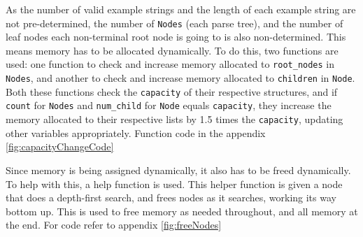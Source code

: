As the number of valid example strings and the length of each example string are not pre-determined, the number of \texttt{Nodes} (each parse tree), and the number of leaf nodes each non-terminal root node is going to is also non-determined. This means memory has to be allocated dynamically. To do this, two functions are used: one function to check and increase memory allocated to \texttt{root\_nodes} in \texttt{Nodes}, and another to check and increase memory allocated to \texttt{children} in \texttt{Node}. Both these functions check the \texttt{capacity} of their respective structures, and if \texttt{count} for \texttt{Nodes} and \texttt{num\_child} for \texttt{Node} equals \texttt{capacity}, they increase the memory allocated to their respective lists by 1.5 times the \texttt{capacity}, updating other variables appropriately. Function code in the appendix \ref{fig:capacityChangeCode}

\vspace{\baselineskip}
Since memory is being assigned dynamically, it also has to be freed dynamically. To help with this, a help function is used. This helper function is given a node that does a depth-first search, and frees nodes as it searches, working its way bottom up. This is used to free memory as needed throughout, and all memory at the end. For code refer to appendix \ref{fig:freeNodes}


